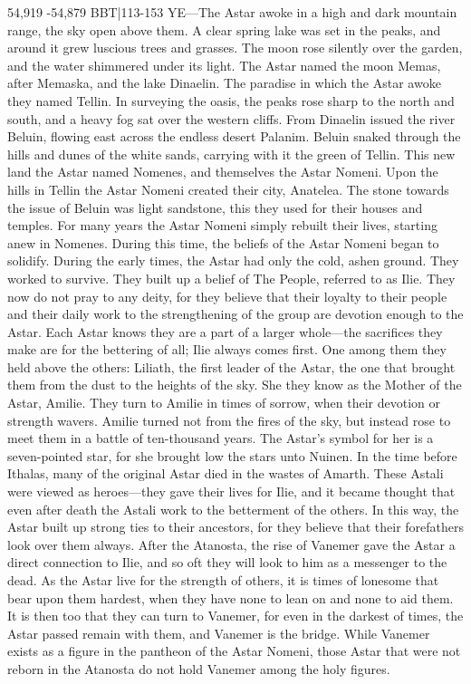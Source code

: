 \documentclass[smalldemyvopaper,11pt,twoside,onecolumn,openright,extrafontsizes]{memoir}
\begin{document}
{{54,919 -54,879 BBT|113-153 YE—The Astar awoke in a high and dark mountain range, the sky open above them. A clear spring lake was set in the peaks, and around it grew luscious trees and grasses. The moon rose silently over the garden, and the water shimmered under its light. The Astar named the moon Memas, after Memaska, and the lake Dinaelin. The paradise in which the Astar awoke they named Tellin. In surveying the oasis, the peaks rose sharp to the north and south, and a heavy fog sat over the western cliffs. From Dinaelin issued the river Beluin, flowing east across the endless desert Palanim. Beluin snaked through the hills and dunes of the white sands, carrying with it the green of Tellin. This new land the Astar named Nomenes, and themselves the Astar Nomeni. Upon the hills in Tellin the Astar Nomeni created their city, Anatelea. The stone towards the issue of Beluin was light sandstone, this they used for their houses and temples. For many years the Astar Nomeni simply rebuilt their lives, starting anew in Nomenes. During this time, the beliefs of the Astar Nomeni began to solidify.
	During the early times, the Astar had only the cold, ashen ground. They worked to survive. They built up a belief of The People, referred to as Ilie. They now do not pray to any deity, for they believe that their loyalty to their people and their daily work to the strengthening of the group are devotion enough to the Astar. Each Astar knows they are a part of a larger whole—the sacrifices they make are for the bettering of all; Ilie always comes first. One among them they held above the others: Liliath, the first leader of the Astar, the one that brought them from the dust to the heights of the sky. She they know as the Mother of the Astar, Amilie. They turn to Amilie in times of sorrow, when their devotion or strength wavers. Amilie turned not from the fires of the sky, but instead rose to meet them in a battle of ten-thousand years. The Astar’s symbol for her is a seven-pointed star, for she brought low the stars unto Nuinen.
In the time before Ithalas, many of the original Astar died in the wastes of Amarth. These Astali were viewed as heroes—they gave their lives for Ilie, and it became thought that even after death the Astali work to the betterment of the others. In this way, the Astar built up strong ties to their ancestors, for they believe that their forefathers look over them always. After the Atanosta, the rise of Vanemer gave the Astar a direct connection to Ilie, and so oft they will look to him as a messenger to the dead. As the Astar live for the strength of others, it is times of lonesome that bear upon them hardest, when they have none to lean on and none to aid them. It is then too that they can turn to Vanemer, for even in the darkest of times, the Astar passed remain with them, and Vanemer is the bridge. While Vanemer exists as a figure in the pantheon of the Astar Nomeni, those Astar that were not reborn in the Atanosta do not hold Vanemer among the holy figures.

}}
\end{document}
